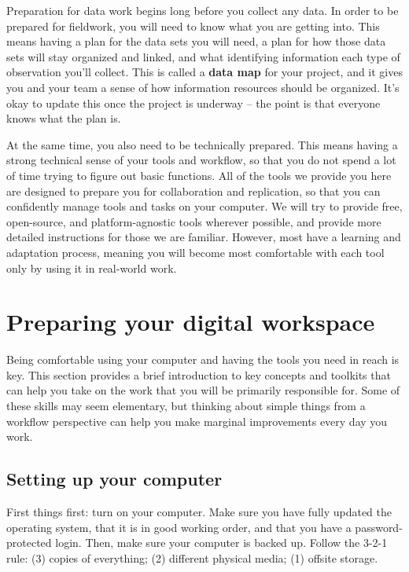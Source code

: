 
\begin{fullwidth}
Preparation for data work begins long before you collect any data.
In order to be prepared for fieldwork, you will need to know what you are getting into.
This means having a plan for the data sets you will need,
a plan for how those data sets will stay organized and linked,
and what identifying information each type of observation you'll collect.
This is called a \textbf{data map} for your project,
and it gives you and your team a sense of how information resources should be organized.
It's okay to update this once the project is underway --
the point is that everyone knows what the plan is.

At the same time, you also need to be technically prepared.
This means having a strong technical sense of your tools and workflow,
so that you do not spend a lot of time trying to figure out basic functions.
All of the tools we provide you here are designed to prepare you for collaboration and replication,
so that you can confidently manage tools and tasks on your computer.
We will try to provide free, open-source, and platform-agnostic tools wherever possible,
and provide more detailed instructions for those we are familiar.
However, most have a learning and adaptation process,
meaning you will become most comfortable with each tool
only by using it in real-world work.
\end{fullwidth}



\section{Preparing your digital workspace}

Being comfortable using your computer and having the tools you need in reach is key.
This section provides a brief introduction to key concepts and toolkits
that can help you take on the work that you will be primarily responsible for.
Some of these skills may seem elementary,
but thinking about simple things from a workflow perspective
can help you make marginal improvements every day you work.

\subsection{Setting up your computer}

First things first: turn on your computer.
Make sure you have fully updated the operating system,
that it is in good working order,
and that you have a password-protected login.
Then, make sure your computer is backed up.
Follow the 3-2-1 rule:
(3) copies of everything;
(2) different physical media;
(1) offsite storage.

